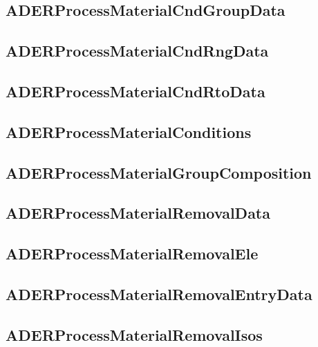 \subsection{ADERProcessMaterialCndGroupData}


\subsection{ADERProcessMaterialCndRngData}


\subsection{ADERProcessMaterialCndRtoData}


\subsection{ADERProcessMaterialConditions}


\subsection{ADERProcessMaterialGroupComposition}


\subsection{ADERProcessMaterialRemovalData}


\subsection{ADERProcessMaterialRemovalEle}


\subsection{ADERProcessMaterialRemovalEntryData}


\subsection{ADERProcessMaterialRemovalIsos}


